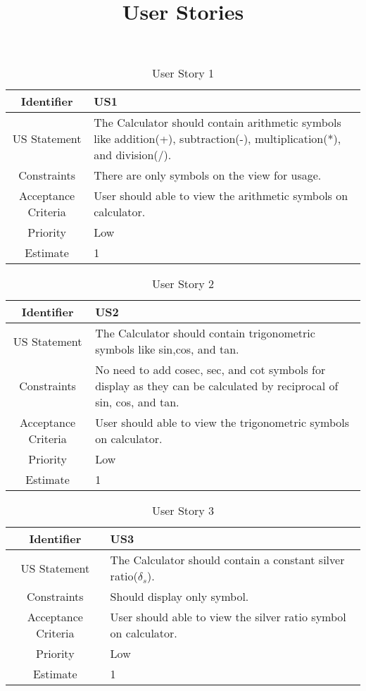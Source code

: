 \documentclass[12pt]{article}
\begin{document}
\title{User Stories}
\date{\vspace{-5ex}}
\maketitle

\begin{table}[h]
    \begin{tabular}{|c|p{14cm}|}
    \hline
      Identifier   & US1 \\
      \hline
       US Statement  & The Calculator should contain arithmetic symbols like addition(+), subtraction(-), multiplication(*), and division(/). \\
       \hline
       Constraints & There are only symbols on the view for usage.\\
       \hline
       Acceptance Criteria & User should able to view the arithmetic symbols on calculator.\\
       \hline
       Priority & Low\\
       \hline
       Estimate & 1\\
       \hline
    \end{tabular}
    \caption{User Story 1}
\label{table:1}
 \end{table}
 
 \begin{table}[h]
    \begin{tabular}{|c|p{14cm}|}
    \hline
      Identifier   & US2 \\
      \hline
       US Statement  & The Calculator should contain trigonometric symbols like sin,cos, and tan.  \\
       \hline
       Constraints & No need to add cosec, sec, and cot symbols for display as they can be calculated by reciprocal of sin, cos, and tan.\\
       \hline
       Acceptance Criteria & User should able to view the trigonometric symbols on calculator. \\
       \hline
       Priority & Low\\
       \hline
       Estimate & 1\\
       \hline
    \end{tabular}
    \caption{User Story 2}
\label{table:2}
\end{table}

\begin{table}[h]
    \begin{tabular}{|c|p{14cm}|}
    \hline
      Identifier   & US3 \\
      \hline
       US Statement  & The Calculator should contain a constant silver ratio($\delta_s$).  \\
       \hline
       Constraints & Should display only symbol. \\
       \hline
       Acceptance Criteria & User should able to view the silver ratio symbol on calculator. \\
       \hline
       Priority & Low\\
       \hline
       Estimate & 1\\
       \hline
    \end{tabular}
    \caption{User Story 3}
\label{table:3}
\end{table}
\end{document}
